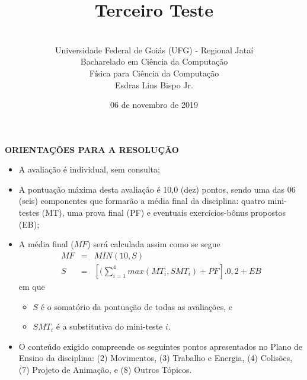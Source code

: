 \documentclass[12pt,a4paper,oneside]{article}
\author{\\Universidade Federal de Goiás (UFG) - Regional Jataí\\Bacharelado em Ciência da Computação \\Física para Ciência da Computação \\Esdras Lins Bispo Jr.}
\title{\sc \huge Terceiro Teste}
\date{06 de novembro de 2019}
\begin{document}
\maketitle

{\bf ORIENTAÇÕES PARA A RESOLUÇÃO}

\footnotesize

\begin{itemize}
	\item A avaliação é individual, sem consulta;
	\item A pontuação máxima desta avaliação é 10,0 (dez) pontos, sendo uma das 06 (seis) componentes que formarão a média final da disciplina: quatro mini-testes (MT), uma prova final (PF) e eventuais exercícios-bônus propostos (EB);
	\item A média final ($MF$) será calculada assim como se segue
	\begin{eqnarray}
	MF & = & MIN(10, S) \nonumber \\
	S & = & [(\sum_{i=1}^{4} max(MT_i, SMT_i ) + PF].0,2  + EB \nonumber
	\end{eqnarray}
	em que 
	\begin{itemize}
		\item $S$ é o somatório da pontuação de todas as avaliações, e
		\item $SMT_i$ é a substitutiva do mini-teste $i$.
	\end{itemize}
	\item O conteúdo exigido compreende os seguintes pontos apresentados no Plano de Ensino da disciplina: (2) Movimentos, (3) Trabalho e Energia, (4) Colisões, (7) Projeto de Animação, e (8) Outros Tópicos.
\end{itemize}


\begin{center}
\end{center}

\newpage

\normalsize
\end{document}
